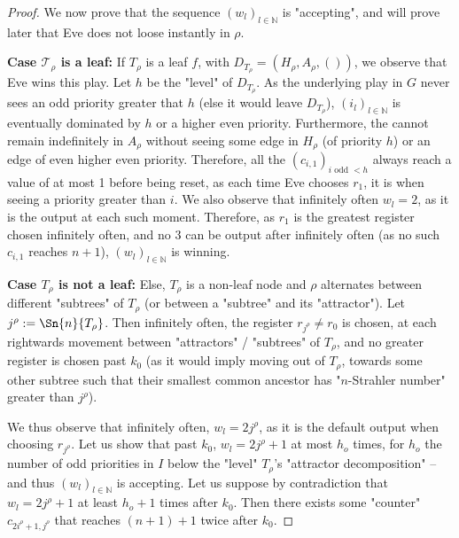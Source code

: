 \documentclass[a4paper,UKenglish,cleveref, autoref, thm-restate]{lipics-v2021}
\newcommand{\NN}{\mathbb{N}}
\newcommand{\T}{\mathcal{T}}
\begin{document}
\begin{proof}
	We now prove that the sequence $(w_l)_{l\in \NN}$ is "accepting", and will prove later that Eve does not loose instantly in $\rho$.
	
	\textbf{Case $\T_\rho$ is a leaf:} If $T_\rho$ is a leaf $f$, with $D_{T_\rho} = (H_{\rho},A_{\rho}, ())$, we observe that Eve wins this play. Let $h$ be the "level" of $D_{T_{\rho}}$. As the underlying play in $G$ never sees an odd priority greater that $h$ (else it would leave $D_{T_{\rho}}$), $(i_l)_{l\in \NN}$ is eventually dominated by $h$ or a higher even priority. Furthermore, the cannot remain indefinitely in $A_{\rho}$ without seeing some edge in $H_{\rho}$ (of priority $h$) or an edge of even higher even priority. Therefore, all the $(c_{i,1})_{i \text{ odd }<h}$ always reach a value of at most 1 before being reset, as each time Eve chooses $r_1$, it is when seeing a priority greater than $i$. We also observe that infinitely often $w_l = 2$, as it is the output at each such moment. Therefore, as $r_1$ is the greatest register chosen infinitely often, and no $3$ can be output after infinitely often (as no such $c_{i,1}$ reaches $n+1$), $(w_l)_{l\in\NN}$ is winning.
	
	\textbf{Case $T_\rho$ is not a leaf:} Else, $T_\rho$ is a non-leaf node and $\rho$ alternates between different "subtrees" of $T_{\rho}$ (or between a "subtree" and its "attractor"). Let $j^\rho := \Sn{n}{T_\rho}$. Then infinitely often, the register $r_{j^{\rho}}\neq r_0$ is chosen, at each rightwards movement between "attractors" / "subtrees" of $T_{\rho}$, and no greater register is chosen past $k_0$ (as it would imply moving out of $T_\rho$, towards some other subtree such that their smallest common ancestor has "$n$-Strahler number" greater than $j^\rho$).
	
	We thus observe that infinitely often, $w_l = 2j^\rho$, as it is the default output when choosing $r_{j^\rho}$. Let us show that past $k_0$, $w_l = 2j^\rho+1$ at most $h_o$ times, for $h_o$ the number of odd priorities in $I$ below the "level" $T_\rho$'s "attractor decomposition" – and thus $(w_l)_{l\in \NN}$ is accepting. Let us suppose by contradiction that $w_l = 2j^\rho+1$ at least $h_o+1$ times after $k_0$. Then there exists some "counter" $c_{2i^\rho+1,j^\rho}$ that reaches $(n+1)+1$ twice after $k_0$.
	

\end{proof}
\end{document}
